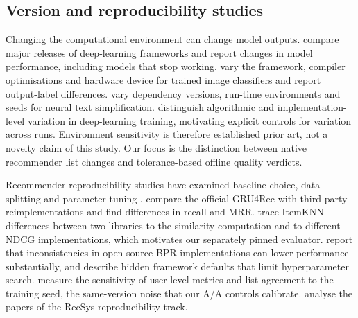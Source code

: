 \documentclass[11pt,a4paper]{article}
\begin{document}

\subsection{Version and reproducibility studies}
Changing the computational environment can change model outputs.
\citet{shahriari2022framework} compare major releases of deep-learning
frameworks and report changes in model performance, including models that stop
working. \citet{louloudakis2023deltann} vary the framework, compiler
optimisations and hardware device for trained image classifiers and report
output-label differences. \citet{popovic2023variation} vary dependency
versions, run-time environments and seeds for neural text simplification.
\citet{pham2020variance} distinguish algorithmic and implementation-level
variation in deep-learning training, motivating explicit controls for
variation across runs.
Environment sensitivity is therefore established prior art, not a novelty
claim of this study. Our focus is the distinction between native recommender
list changes and tolerance-based offline quality verdicts.

Recommender reproducibility studies have examined baseline choice, data
splitting and parameter tuning \citep{ferraridacrema2019progress,sun2020rigorous}.
\citet{hidasi2023thirdparty} compare the
official GRU4Rec with third-party reimplementations and find differences in
recall and MRR. \citet{schmidt2024itemknn} trace ItemKNN differences between
two libraries to the similarity computation and to different NDCG
implementations, which motivates our separately pinned evaluator.
\citet{milogradskii2024bpr} report that inconsistencies in open-source BPR
implementations can lower performance substantially, and
\citet{berling2025defaults} describe hidden framework defaults that limit
hyperparameter search. \citet{rodriguez2026seeds} measure the sensitivity of
user-level metrics and list agreement to the training seed, the same-version
noise that our A/A controls calibrate. \citet{said2026reproducibility} analyse
the papers of the RecSys reproducibility track.
\end{document}
